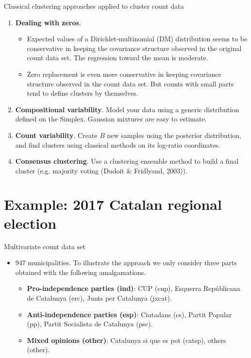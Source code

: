 \documentclass[9pt]{beamer}
\begin{document}
\begin{frame}{Classical clustering approaches applied to cluster count data}

\begin{enumerate}
\item \textbf{Dealing with zeros}. 
\begin{itemize}
\item Expected values of a Dirichlet-multinomial (DM) distribution seems to be conservative in keeping the covariance structure observed in the original count data set. The regression toward the mean is moderate.
\item Zero replacement is even more conservative in keeping covariance structure observed in the count data set. But counts with small parts tend to define clusters by themselves.
\end{itemize}
\item \textbf{Compositional variability}. Model your data using a generic distribution defined on the Simplex. Gaussian mixtures  are easy to estimate.
\item \textbf{Count variability}. Create $B$ new samples using the posterior distribution, and find clusters using classical methods on its log-ratio coordinates.
\item \textbf{Consensus clustering}. Use a clustering ensemble method to build a final cluster  (e.g. majority voting (Dudoit \& Fridlyand, 2003)).
\end{enumerate}
\end{frame}

\section{Example: 2017 Catalan regional election}

\begin{frame}{Multivariate count data set}

\begin{itemize}
\item 947 municipalities. To illustrate the approach we only consider three parts obtained with the following amalgamations.
\begin{itemize}
\item \textbf{Pro-independence parties (ind)}: CUP (cup), Esquerra Repúblicana de Catalunya (erc), Junts per Catalunya (jxcat).
\item \textbf{Anti-independence parties (esp)}: Ciutadans (cs), Partit Popular (pp), Partit Socialista de Catalunya (psc).
\item \textbf{Mixed opinions (other)}: Catalunya si que es pot (catsp), others (other).
\end{itemize}

\end{itemize}



\end{frame}
\end{document}
